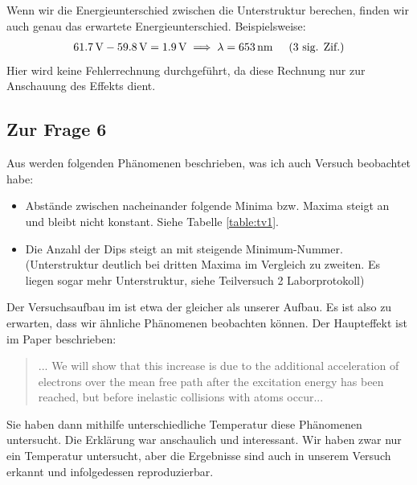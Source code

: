 		Wenn wir die Energieunterschied zwischen die Unterstruktur berechen, finden wir auch genau das erwartete Energieunterschied. Beispielsweise:
		\begin{align}
			\SI{61.7}{\volt} - \SI{59.8}{\volt} = \SI{1.9}{\volt} \implies \lambda = \SI{653}{\nano\meter} \hspace{0.5cm}\text{(3 sig. Zif.)}
		\end{align}
		Hier wird keine Fehlerrechnung durchgeführt, da diese Rechnung nur zur Anschauung des Effekts dient. 

	\subsection{Zur Frage 6}
		Aus \cite{rapior_new_2006} werden folgenden Phänomenen beschrieben, was ich auch Versuch beobachtet habe:
		\begin{itemize}
			\item Abstände zwischen nacheinander folgende Minima bzw. Maxima steigt an und bleibt nicht konstant. Siehe Tabelle \ref{table:tv1}.
			\item Die Anzahl der Dips steigt an mit steigende Minimum-Nummer. (Unterstruktur deutlich bei dritten Maxima im Vergleich zu zweiten. Es liegen sogar mehr Unterstruktur, siehe Teilversuch 2 Laborprotokoll)
		\end{itemize}
		Der Versuchsaufbau im \cite{rapior_new_2006} ist etwa der gleicher als unserer Aufbau. Es ist also zu erwarten, dass wir ähnliche Phänomenen beobachten können. Der Haupteffekt ist im Paper beschrieben:
		\begin{quote}
			... We will show that this increase is due to the additional acceleration of electrons over the mean free path after the excitation energy has been reached, but before inelastic collisions with atoms occur...
		\end{quote}
		Sie haben dann mithilfe unterschiedliche Temperatur diese Phänomenen untersucht. Die Erklärung war anschaulich und interessant. Wir haben zwar nur ein Temperatur untersucht, aber die Ergebnisse sind auch in unserem Versuch erkannt und infolgedessen reproduzierbar. 



	